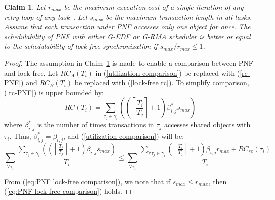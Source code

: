 \documentclass[12pt,english]{report}
\newtheorem{clm}{Claim}
\newtheorem{proof}{Proof}
\begin{document}
\begin{clm}\label{PNF lock-free comparison}
Let $r_{max}$ be the maximum execution cost of a single iteration of any retry loop of any task~\cite{key-5}. Let $s_{max}$ be the maximum transaction length in all tasks. Assume that each transaction under PNF accesses only one object for once. The schedulability of PNF with either G-EDF or G-RMA scheduler is better or equal to the schedulability of lock-free
synchronization if $s_{max}/r_{max}\le 1$.
\end{clm}
\begin{proof}\normalfont
The assumption in Claim~\ref{PNF lock-free comparison} is made to enable a comparison between PNF and lock-free. Let $RC_{A}(T_{i})$ in (\ref{utilization comparison}) be replaced
with (\ref{rc-PNF}) and $RC_{B}(T_{i})$ be replaced with (\ref{lock-free rc}).
To simplify comparison, (\ref{rc-PNF}) is upper bounded by:
%
\begin{equation*}
RC(T_{i})=\sum_{\tau_{j}\in\gamma_{i}}\left(\left(\left\lceil \frac{T_{i}}{T_{j}}\right\rceil +1\right)\beta_{i,j}^* s_{max}\right)
\end{equation*}
%
where $\beta_{i,j}^*$ is the number of times transactions in $\tau_j$ accesses shared objects with $
\tau_i$. Thus, $\beta_{i,j}^* = \beta_{i,j}$, and (\ref{utilization comparison}) will be:
\begin{equation}
\sum_{\forall\tau_{i}}\frac{\sum_{\tau_{j}\in\gamma_{i}}\left(\left(\left\lceil \frac{T_{i}}{T_{j}}\right\rceil +1\right)\beta_{i,j}s_{max}\right)}{T_{i}}\le \sum_{\forall\tau_{i}}\frac{\sum_{\forall\tau_{j}\in\gamma_{i}}\left(\left\lceil \frac{T_{i}}{T_{j}}\right\rceil +1\right)\beta_{i,j}r_{max}+RC_{re}(\tau_i)}{T_{i}}\label{eq:PNF lock-free comparison}
\end{equation}

From (\ref{eq:PNF lock-free comparison}), we note that if $s_{max}\le r_{max}$,
then (\ref{eq:PNF lock-free comparison}) holds. 
\end{proof}
\end{document}
